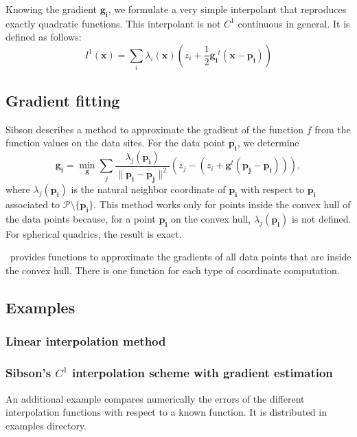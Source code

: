 Knowing the gradient $\mathbf{g_i}$, we formulate a very simple
interpolant that reproduces exactly quadratic functions. This
interpolant is not $C^1$ continuous in general.  It is defined as
follows:
\begin{displaymath}
  I^1(\mathbf{x}) = \sum_i \lambda_i(\mathbf{x}) 
  (z_i + \frac{1}{2} \mathbf{g_i}^t (\mathbf{x} - \mathbf{p_i}))  
\end{displaymath} 



\subsection{Gradient fitting} \label{s:gradient_fitting}
Sibson describes a method to approximate the gradient of the function
$f$ from the function values on the data sites. For the data point
$\mathbf{p_i}$, we determine
$$\mathbf{g_i} = \min_\mathbf{g} \sum_j
\frac{\lambda_j(\mathbf{p_i})}{\|\mathbf{p_i} - \mathbf{p_j}\|^2}
\left( z_j - (z_i + \mathbf{g}^t (\mathbf{p_j} -\mathbf{p_i})) \right),
$$
where $\lambda_j(\mathbf{p_i})$ is the natural neighbor coordinate
of $\mathbf{p_i}$ with respect to $\mathbf{p_i}$ associated to
$\mathcal{P} \setminus \{\mathbf{p_i}\}$. This method works only for
points inside the convex hull of the data points because, for a point
$\mathbf{p_i}$ on the convex hull, $\lambda_j(\mathbf{p_i})$ is not
defined. For spherical quadrics, the result is exact.

\cgal\ provides functions to approximate the gradients of all data
points that are inside the convex hull. There is one function for each
type of coordinate computation.


\subsection{Examples}\label{subsec:interpol_examples}
\subsubsection{Linear interpolation method}

\subsubsection{Sibson's $C^1$ interpolation scheme with gradient estimation}

An additional example compares numerically the errors of the different 
interpolation functions with respect to a known function. 
It is distributed in examples directory.

